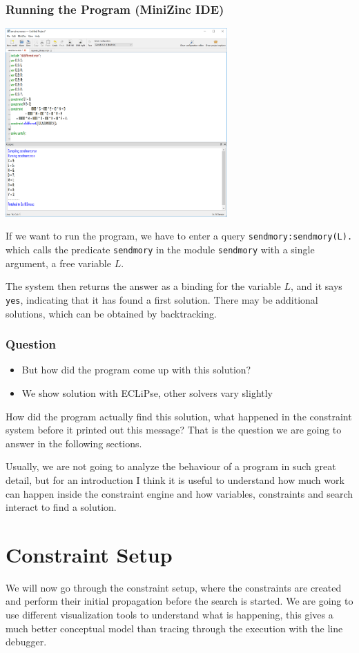 \begin{frame}
  \frametitle{Running the Program (MiniZinc IDE)}
  \includegraphics[width=8.5cm]{../sendmore/images/idesendmore}
\end{frame}


If we want to run the program, we have to enter a query \texttt{sendmory:sendmory(L).} which calls the predicate \texttt{sendmory} in the module \texttt{sendmory} with a single argument, a free variable $L$.

The system then returns the answer as a binding for the variable $L$, and it says \texttt{yes}, indicating that it has found a first solution. There may be additional solutions, which can be obtained by backtracking.



\begin{frame}
\frametitle{Question}
\begin{itemize}
\item But how did the program come up with this solution?
  \item We show solution with ECLiPse, other solvers vary slightly
\end{itemize}
\end{frame}

How did the program actually find this solution, what happened in the constraint system before it printed out this message? That is the question we are going to answer in the following sections.

Usually, we are not going to analyze the behaviour of a program in such great detail, but for an introduction I think it is useful to understand how much work can happen inside the constraint engine and how variables, constraints and search interact to find a solution.

\section{Constraint Setup}
We will now go through the constraint setup, where the constraints are created and perform their initial propagation before the search is started. We are going to use different visualization tools to understand what is happening, this gives a much better conceptual model than tracing through the execution with the line debugger.

